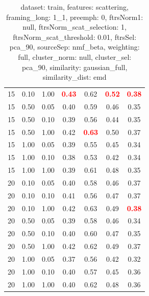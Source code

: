 \documentclass[12pt,a4paper,fleqn]{tufte-handout}
\begin{document}
\begin{table}
\begin{center}
\begin{tabular}{lllcccc}
15 & 0.10 & 1.00 & \textbf{\textcolor{red}{0.43}} & 0.62 & \textbf{\textcolor{red}{0.52}} & \textbf{\textcolor{red}{0.38}} \\                    
15 & 0.50 & 0.05 & 0.40 & 0.59 & 0.46 & 0.35 \\                    
15 & 0.50 & 0.10 & 0.39 & 0.56 & 0.44 & 0.35 \\                    
15 & 0.50 & 1.00 & 0.42 & \textbf{\textcolor{red}{0.63}} & 0.50 & 0.37 \\                    
15 & 1.00 & 0.05 & 0.39 & 0.55 & 0.45 & 0.34 \\                    
15 & 1.00 & 0.10 & 0.38 & 0.53 & 0.42 & 0.34 \\                    
15 & 1.00 & 1.00 & 0.39 & 0.61 & 0.48 & 0.35 \\                    
20 & 0.10 & 0.05 & 0.40 & 0.58 & 0.46 & 0.37 \\                    
20 & 0.10 & 0.10 & 0.41 & 0.56 & 0.47 & 0.37 \\                    
20 & 0.10 & 1.00 & 0.42 & 0.63 & 0.49 & \textbf{\textcolor{red}{0.38}} \\                    
20 & 0.50 & 0.05 & 0.39 & 0.58 & 0.46 & 0.34 \\                    
20 & 0.50 & 0.10 & 0.40 & 0.60 & 0.47 & 0.35 \\                    
20 & 0.50 & 1.00 & 0.42 & 0.62 & 0.49 & 0.37 \\                    
20 & 1.00 & 0.05 & 0.37 & 0.56 & 0.42 & 0.32 \\                    
20 & 1.00 & 0.10 & 0.40 & 0.57 & 0.45 & 0.36 \\                    
20 & 1.00 & 1.00 & 0.40 & 0.62 & 0.48 & 0.36 \\                    
\end{tabular}                    
\end{center}                    
\caption{dataset: train, features: scattering, framing\_long: 1\_1, preemph: 0, ftrsNorm1: null, ftrsNorm\_scat\_selection: 1, ftrsNorm\_scat\_threshold: 0.01, ftrsSel: pca\_90, sourceSep: nmf\_beta, weighting: full, cluster\_norm: null, cluster\_sel: pca\_90, similarity: gaussian\_full, similarity\_dist: emd}                    
\label{datasetrFeaturscFraminlong1_1Preemp0Ftrsnorm1nuFtrsnoscatselect1Ftrsnoscatthresh0.01Ftrsselpc90SourcesepnmbeWeightfuClustenormnuClusteselpc90SimilagafuSimiladistem}                    
\end{table}                    
 
\end{document}
